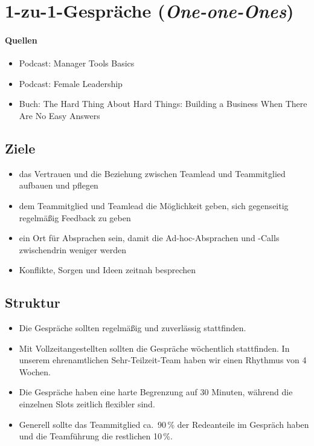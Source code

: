 \section{1-zu-1-Gespräche (\emph{One-one-Ones})}
\label{1-zu-1}

\paragraph{Quellen}

\begin{itemize}
 \item Podcast: Manager Tools Basics \cite[04.\,07.\,2005 bis 11.\,07.\,2005]{manager-tools-basics}
 \item Podcast: Female Leadership \cite[Folge 15]{female-leadership-gespraechsfuehrung}
 \item Buch: The Hard Thing About Hard Things: Building a Business When There Are No Easy Answers \cite{the-hard-thing-about-hard-things}
\end{itemize}

\subsection{Ziele}

\begin{itemize}
 \item das Vertrauen und die Beziehung zwischen Teamlead und Teammitglied aufbauen und pflegen
 \item dem Teammitglied und Teamlead die Möglichkeit geben, sich gegenseitig regelmäßig Feedback zu geben
 \item ein Ort für Absprachen sein, damit die Ad-hoc-Absprachen und -Calls zwischendrin weniger werden
 \item Konflikte, Sorgen und Ideen zeitnah besprechen
\end{itemize}

\subsection{Struktur}

\begin{itemize}
 \item Die Gespräche sollten regelmäßig und zuverlässig stattfinden.
 \item Mit Vollzeitangestellten sollten die Gespräche wöchentlich stattfinden. In unserem ehrenamtlichen Sehr-Teilzeit-Team haben wir einen Rhythmus von 4 Wochen.
 \item Die Gespräche haben eine harte Begrenzung auf 30 Minuten, während die einzelnen Slots zeitlich flexibler sind.
 \item Generell sollte das Teammitglied ca.~90\,\% der Redeanteile im Gespräch haben und die Teamführung die restlichen 10\,\%.
\end{itemize}

